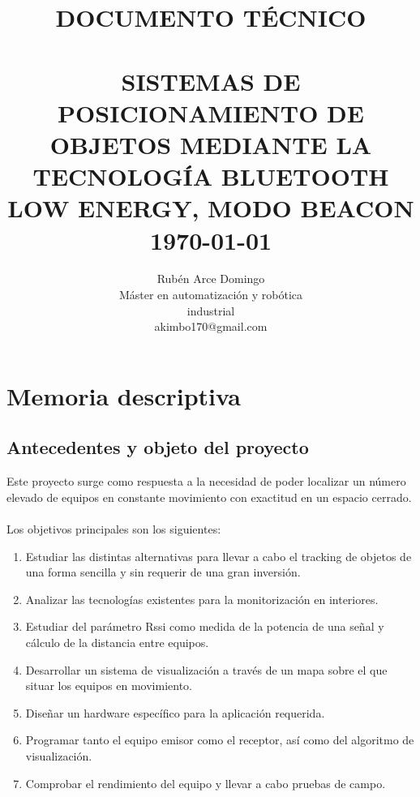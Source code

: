 \documentclass[paper=a4, fontsize=11pt,twoside]{scrartcl}	%
\title{	\normalsize \textsc{DOCUMENTO TÉCNICO} 	
		 	\\[2.0cm]								
             \HRule{0.5pt} \\						
             \LARGE \textbf{\uppercase{Sistemas de posicionamiento de objetos mediante la tecnología Bluetooth Low Energy, modo Beacon}}	
			\HRule{2pt} \\ [0.5cm]		
			\normalsize \today			
		}
\author{
    Rubén Arce Domingo\\	
		Máster en automatización y robótica\\	
        industrial\\
        akimbo170@gmail.com\\
}
\makeatletter
\def\printtitle{%
{\centering \@title\par}}
\def\printauthor{%
{\centering \large \@author}}
\makeatother
\begin{document}
\thispagestyle{empty}		
\printtitle					
  	\vfill
\printauthor				
\newpage
\cleardoublepage
\tableofcontents
\listoffigures
\cleardoublepage
\pagestyle{fancy}
\section{Memoria descriptiva}
    \subsection{Antecedentes y objeto del proyecto}
        Este proyecto surge como respuesta a la necesidad de poder localizar un número elevado de equipos en 
        constante movimiento con exactitud en un espacio cerrado.
        \paragraph{}
       Los objetivos principales son los siguientes:
        \begin{enumerate}
            \item Estudiar las distintas alternativas para llevar a cabo el tracking de objetos de una forma
            sencilla y sin requerir de una gran inversión.
            \item Analizar las tecnologías existentes para la monitorización en interiores.
            \item Estudiar del parámetro Rssi como medida de la potencia de una señal y cálculo de la distancia entre equipos.
            \item Desarrollar un sistema de visualización a través de un mapa sobre el que situar los equipos en movimiento.
            \item Diseñar un hardware específico para la aplicación requerida.
            \item Programar tanto el equipo emisor como el receptor, así como del algoritmo de visualización.
            \item Comprobar el rendimiento del equipo y llevar a cabo pruebas de campo. 
        \end{enumerate}
\end{document}
